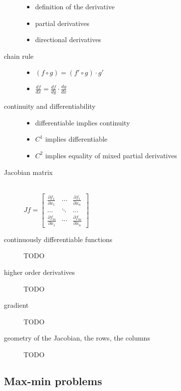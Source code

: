\begin{description}
\item[]\hfill
	\begin{itemize}
		\item definition of the derivative
		\item partial derivatives
		\item directional derivatives
	\end{itemize}
\item[chain rule]\hfill
	\begin{itemize}
	\item$(f\circ g) = (f' \circ g)\cdot g'$
	\item$\frac{d f}{d x} = \frac{d f}{d g}\cdot \frac{d g}{d x}$
	\end{itemize}
\item[continuity and differentiability]\hfill
	\begin{itemize}
	\item differentiable implies continuity
	\item $C^1$ implies differentiable
	\item $C^2$ implies equality of mixed partial derivatives
	\end{itemize}
\item[Jacobian matrix]\hfill\\
	$
	Jf = \begin{bmatrix}
	  \frac{\partial f_1}{\partial x_1} & \cdots & \frac{\partial f_1}{\partial x_n}\\
	  \ldots & \ddots & \ldots \\
	  \frac{\partial f_m}{\partial x_1} & \cdots & \frac{\partial f_m}{\partial x_n}
	 \end{bmatrix}
	$
\item[continuously differentiable functions]TODO
\item[higher order derivatives]TODO
\item[gradient]TODO
\item[geometry of the Jacobian, the rows, the columns]TODO
\end{description}


\subsection{Max-min problems}


